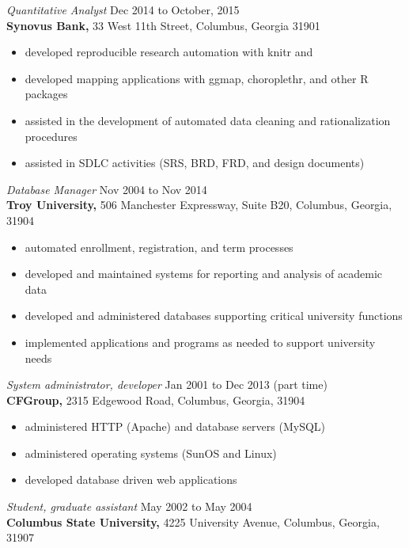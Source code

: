 \documentclass[margin, 10pt]{res} %
\begin{document}
\begin{resume}
{\it Quantitative Analyst} \hfill Dec 2014 to October, 2015 \\
\textbf{Synovus Bank,} 33 West 11th Street, Columbus, Georgia 31901

\begin{itemize} \itemsep -2pt %
\item developed reproducible research automation with knitr and \LaTeXe
\item developed mapping applications with ggmap, choroplethr, and other \textsf{R} packages
\item assisted in the development of automated data cleaning and rationalization procedures
\item assisted in SDLC activities (SRS, BRD, FRD, and design documents)
\end{itemize}
 
{\it Database Manager} \hfill Nov 2004 to Nov 2014 \\
\textbf{Troy University,} 506 Manchester Expressway, Suite B20, Columbus, Georgia, 31904

\begin{itemize} \itemsep -2pt %
\item automated enrollment, registration, and term processes
\item developed and maintained systems for reporting and analysis of academic data
\item developed and administered databases supporting critical university functions 
\item implemented applications and programs as needed to support university needs 
\end{itemize}
 
{\it System administrator, developer} \hfill Jan 2001 to Dec 2013 (part time) \\
\textbf{CFGroup,} 2315 Edgewood Road, Columbus, Georgia, 31904

\begin{itemize} \itemsep -2pt %
\item administered HTTP (Apache) and database servers (MySQL)
\item administered operating systems (SunOS and Linux)
\item developed database driven web applications
\end{itemize}
 
{\it Student, graduate assistant} \hfill May 2002 to May 2004 \\
\textbf{Columbus State University,} 4225 University Avenue, Columbus, Georgia, 31907


\end{resume}
\end{document}
